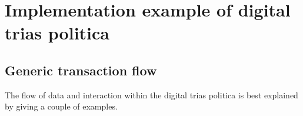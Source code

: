\documentclass{article}
\begin{document}
% 
% 
% 



\section{Implementation example of digital trias politica}
\subsection{Generic transaction flow}
The flow of data and interaction within the digital trias politica is best explained by giving a couple of examples.
\end{document}
